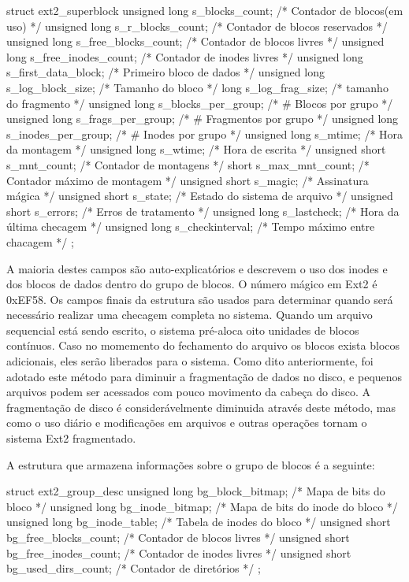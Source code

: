 struct ext2_superblock {
   unsigned long  s_blocks_count;      /* Contador de blocos(em uso) */
   unsigned long  s_r_blocks_count;    /* Contador de blocos reservados */
   unsigned long  s_free_blocks_count; /* Contador de blocos livres */
   unsigned long  s_free_inodes_count; /* Contador de inodes livres */
   unsigned long  s_first_data_block;  /* Primeiro bloco de dados */
   unsigned long  s_log_block_size;    /* Tamanho do bloco */
   long           s_log_frag_size;     /* tamanho do fragmento */
   unsigned long  s_blocks_per_group;  /* # Blocos por grupo */
   unsigned long  s_frags_per_group;   /* # Fragmentos por grupo */
   unsigned long  s_inodes_per_group;  /* # Inodes por grupo */
   unsigned long  s_mtime;             /* Hora da montagem */
   unsigned long  s_wtime;             /* Hora de escrita */
   unsigned short s_mnt_count;         /* Contador de montagens */
   short          s_max_mnt_count;     /* Contador máximo de montagem */
   unsigned short s_magic;             /* Assinatura mágica */
   unsigned short s_state;             /* Estado do sistema de arquivo */
   unsigned short s_errors;            /* Erros de tratamento */
   unsigned long  s_lastcheck;         /* Hora da última checagem */
   unsigned long  s_checkinterval;     /* Tempo máximo entre chacagem */
};

A maioria destes campos são auto-explicatórios e descrevem o uso dos inodes e dos blocos de dados dentro do grupo de blocos. O número mágico em  Ext2 é 0xEF58. Os campos finais da estrutura são usados para determinar quando será necessário realizar uma checagem completa no sistema.
Quando um arquivo sequencial está sendo escrito, o sistema pré-aloca oito unidades de blocos contínuos. Caso no momemento do fechamento do arquivo os blocos exista blocos adicionais, eles serão liberados para o sistema. Como dito anteriormente, foi adotado este método para diminuir a fragmentação de dados no disco, e pequenos arquivos podem ser acessados com pouco movimento da cabeça do disco. A fragmentação de disco é considerávelmente diminuida através deste método, mas como o uso diário e modificações em arquivos e outras operações tornam o sistema Ext2 fragmentado. 


A estrutura que armazena informações sobre o grupo de blocos é a seguinte:

struct ext2_group_desc {
    unsigned long bg_block_bitmap;       /* Mapa de bits do bloco */
    unsigned long bg_inode_bitmap;       /* Mapa de bits do inode do bloco */
    unsigned long bg_inode_table;        /* Tabela de inodes do bloco */
    unsigned short bg_free_blocks_count; /* Contador de blocos livres */
    unsigned short bg_free_inodes_count; /* Contador de inodes livres */
    unsigned short bg_used_dirs_count;   /* Contador de diretórios */
};

